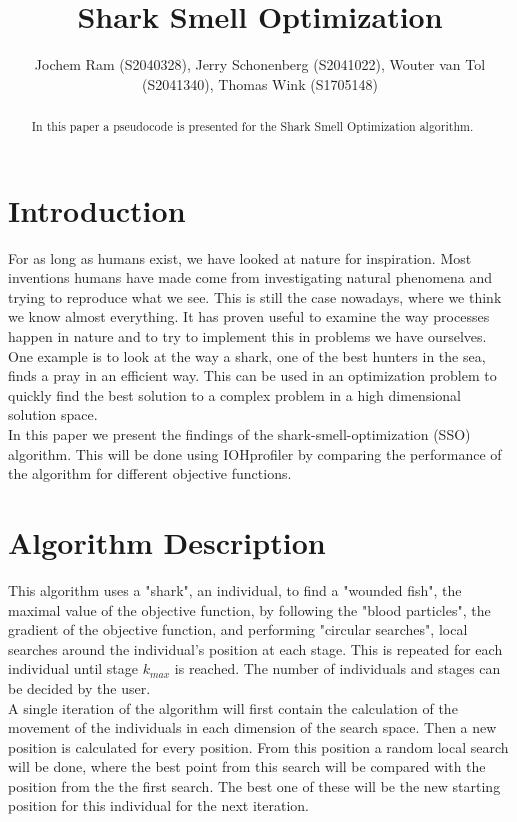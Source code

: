 \documentclass[runningheads]{llncs}
\begin{document}
%
\title{Shark Smell Optimization}
%
%
\author{Jochem Ram (S2040328), Jerry Schonenberg (S2041022), Wouter van Tol (S2041340), Thomas Wink (S1705148)}
%
%
%
\maketitle              %
%
\begin{abstract}
In this paper a pseudocode is presented for the Shark Smell Optimization algorithm.
\end{abstract}





\section{Introduction}
For as long as humans exist, we have looked at nature for inspiration. Most inventions humans have made come from investigating natural phenomena and trying to reproduce what we see. This is still the case nowadays, where we think we know almost everything. It has proven useful to examine the way processes happen in nature and to try to implement this in problems we have ourselves. One example is to look at the way a shark, one of the best hunters in the sea, finds a pray in an efficient way. This can be used in an optimization problem to quickly find the best solution to a complex problem in a high dimensional solution space.\\
In this paper we present the findings of the shark-smell-optimization (SSO)\cite{abedinia2014shark} algorithm. This will be done using IOHprofiler by comparing the performance of the algorithm for different objective functions.

\section{Algorithm Description} \label{sec:description}
This algorithm uses a "shark", an individual, to find a "wounded fish", the maximal value of the objective function, by following the "blood particles", the gradient of the objective function, and performing "circular searches", local searches around the individual's position at each stage. This is repeated for each individual until stage $k_{max}$ is reached. The number of individuals and stages can be decided by the user. \\
A single iteration of the algorithm will first contain the calculation of the movement of the individuals in each dimension of the search space. Then a new position is calculated for every position. From this position a random local search will be done, where the best point from this search will be compared with the position from the the first search. The best one of these will be the new starting position for this individual for the next iteration.
\end{document}

